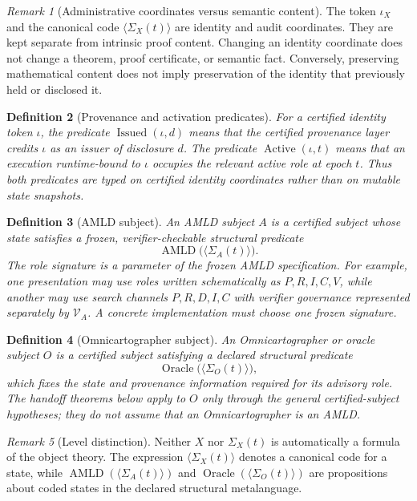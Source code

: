 \documentclass[11pt]{article}
\newtheorem{definition}{Definition}[section]
\theoremstyle{remark}
\newtheorem{remark}[definition]{Remark}
\newcommand{\Issued}{\operatorname{Issued}}
\newcommand{\Active}{\operatorname{Active}}
\newcommand{\AMLD}{\operatorname{AMLD}}
\newcommand{\Oracle}{\operatorname{Oracle}}
\begin{document}
\begin{remark}[Administrative coordinates versus semantic content]
The token $\iota_X$ and the canonical code $\langle\Sigma_X(t)\rangle$ are identity and audit coordinates. They are kept separate from intrinsic proof content. Changing an identity coordinate does not change a theorem, proof certificate, or semantic fact. Conversely, preserving mathematical content does not imply preservation of the identity that previously held or disclosed it.
\end{remark}

\begin{definition}[Provenance and activation predicates]
For a certified identity token $\iota$, the predicate $\Issued(\iota,d)$ means that the certified provenance layer credits $\iota$ as an issuer of disclosure $d$. The predicate $\Active(\iota,t)$ means that an execution runtime-bound to $\iota$ occupies the relevant active role at epoch $t$. Thus both predicates are typed on certified identity coordinates rather than on mutable state snapshots.
\end{definition}

\begin{definition}[AMLD subject]
An AMLD subject $A$ is a certified subject whose state satisfies a frozen, verifier-checkable structural predicate
\[
\AMLD\bigl(\langle\Sigma_A(t)\rangle\bigr).
\]
The role signature is a parameter of the frozen AMLD specification. For example, one presentation may use roles written schematically as $P,R,I,C,V$, while another may use search channels $P,R,D,I,C$ with verifier governance represented separately by $\mathcal V_A$. A concrete implementation must choose one frozen signature.
\end{definition}

\begin{definition}[Omnicartographer subject]
An Omnicartographer or oracle subject $O$ is a certified subject satisfying a declared structural predicate
\[
\Oracle\bigl(\langle\Sigma_O(t)\rangle\bigr),
\]
which fixes the state and provenance information required for its advisory role. The handoff theorems below apply to $O$ only through the general certified-subject hypotheses; they do not assume that an Omnicartographer is an AMLD.
\end{definition}

\begin{remark}[Level distinction]
Neither $X$ nor $\Sigma_X(t)$ is automatically a formula of the object theory. The expression $\langle\Sigma_X(t)\rangle$ denotes a canonical code for a state, while $\AMLD(\langle\Sigma_A(t)\rangle)$ and $\Oracle(\langle\Sigma_O(t)\rangle)$ are propositions about coded states in the declared structural metalanguage.
\end{remark}
\end{document}
